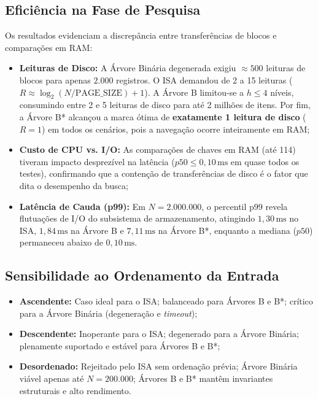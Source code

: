 \documentclass[12pt,a4paper]{article}
\begin{document}
\subsection{Eficiência na Fase de Pesquisa}
Os resultados evidenciam a discrepância entre transferências de blocos e comparações em RAM:
\begin{itemize}
    \item \textbf{Leituras de Disco:} A Árvore Binária degenerada exigiu $\approx 500$ leituras de blocos para apenas $2.000$ registros. O ISA demandou de 2 a 15 leituras ($R \approx \log_2(N/\text{PAGE\_SIZE}) + 1$). A Árvore B limitou-se a $h \le 4$ níveis, consumindo entre 2 e 5 leituras de disco para até 2 milhões de itens. Por fim, a Árvore B* alcançou a marca ótima de \textbf{exatamente 1 leitura de disco} ($R = 1$) em todos os cenários, pois a navegação ocorre inteiramente em RAM;
    \item \textbf{Custo de CPU vs. I/O:} As comparações de chaves em RAM (até 114) tiveram impacto desprezível na latência ($p50 \le 0{,}10\,\text{ms}$ em quase todos os testes), confirmando que a contenção de transferências de disco é o fator que dita o desempenho da busca;
    \item \textbf{Latência de Cauda (p99):} Em $N = 2.000.000$, o percentil p99 revela flutuações de I/O do subsistema de armazenamento, atingindo $1{,}30\,\text{ms}$ no ISA, $1{,}84\,\text{ms}$ na Árvore B e $7{,}11\,\text{ms}$ na Árvore B*, enquanto a mediana ($p50$) permaneceu abaixo de $0{,}10\,\text{ms}$.
\end{itemize}

\subsection{Sensibilidade ao Ordenamento da Entrada}
\begin{itemize}
    \item \textbf{Ascendente:} Caso ideal para o ISA; balanceado para Árvores B e B*; crítico para a Árvore Binária (degeneração e \textit{timeout});
    \item \textbf{Descendente:} Inoperante para o ISA; degenerado para a Árvore Binária; plenamente suportado e estável para Árvores B e B*;
    \item \textbf{Desordenado:} Rejeitado pelo ISA sem ordenação prévia; Árvore Binária viável apenas até $N=200.000$; Árvores B e B* mantêm invariantes estruturais e alto rendimento.
\end{itemize}
\end{document}
